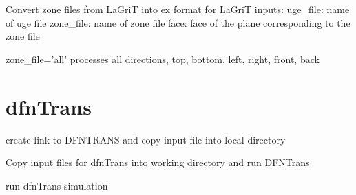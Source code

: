 \documentclass[letterpaper,10pt,english]{sphinxmanual}
\begin{document}

\begin{fulllineitems}
\label{pydfnworks:pydfnworks.flow.zone2ex}
Convert zone files from LaGriT into ex format for LaGriT
inputs:
uge\_file: name of uge file
zone\_file: name of zone file
face: face of the plane corresponding to the zone file

zone\_file='all' processes all directions, top, bottom, left, right, front, back

\end{fulllineitems}



\section{dfnTrans}
\label{pydfnworks:module-pydfnworks.transport}\label{pydfnworks:dfntrans}

\begin{fulllineitems}
\label{pydfnworks:pydfnworks.transport.copy_dfnTrans_files}
create link to DFNTRANS and copy input file into local directory

\end{fulllineitems}


\begin{fulllineitems}
\label{pydfnworks:pydfnworks.transport.dfnTrans}
Copy input files for dfnTrans into working directory and run DFNTrans

\end{fulllineitems}


\begin{fulllineitems}
\label{pydfnworks:pydfnworks.transport.run_dfnTrans}
run dfnTrans simulation

\end{fulllineitems}
\end{document}
